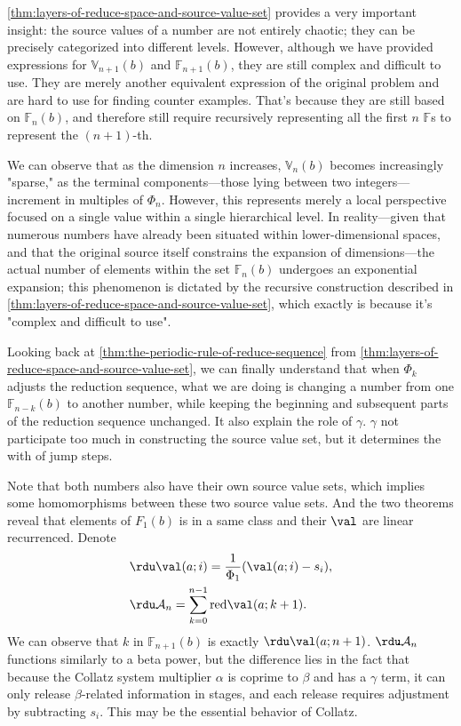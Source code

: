 \cref{thm:layers-of-reduce-space-and-source-value-set} provides a very important insight: the source values of a number are not entirely chaotic; they can be precisely categorized into different levels.
However, although we have provided expressions for $\mathbb{V}_{n+1}(b)$ and $\mathbb{F}_{n+1}(b)$, they are still complex and difficult to use.
They are merely another equivalent expression of the original problem and are hard to use for finding counter examples.
That's because they are still based on $\mathbb{F}_{n}(b)$, and therefore still require recursively representing all the first $n$ $\mathbb{F}$s to represent the $(n+1)$-th.

We can observe that as the dimension $n$ increases, $\mathbb{V}_{n}(b)$ becomes increasingly "sparse," as the terminal components—those lying between two integers—increment in multiples of $\Phi_{n}$. However, this represents merely a local perspective focused on a single value within a single hierarchical level. In reality—given that numerous numbers have already been situated within lower-dimensional spaces, and that the original source itself constrains the expansion of dimensions—the actual number of elements within the set $\mathbb{F}_{n}(b)$ undergoes an exponential expansion; this phenomenon is dictated by the recursive construction described in \cref{thm:layers-of-reduce-space-and-source-value-set}, which exactly is because it's "complex and difficult to use".

Looking back at \cref{thm:the-periodic-rule-of-reduce-sequence} from \cref{thm:layers-of-reduce-space-and-source-value-set}, we can finally understand that when $\Phi_k$ adjusts the reduction sequence, what we are doing is changing a number from one $\mathbb{F}_{n-k}(b)$ to another number, while keeping the beginning and subsequent parts of the reduction sequence unchanged. It also explain the role of $\gamma$. $\gamma$ not participate too much in constructing the source value set, but it determines the with of jump steps.

Note that both numbers also have their own source value sets, which implies some homomorphisms between these two source value sets.
And the two theorems reveal that elements of $F_{1}(b)$ is in a same class and their $\val$ are linear recurrenced. Denote
\begin{align*}
    &\rdu\val(a;i) = \frac{1}{\Phi_1}(\val(a;i) - s_i), \\
    &\rdu\mathcal{A}_n = \sum_{k=0}^{n-1}\mathrm{red}\val(a;k + 1).
\end{align*}
We can observe that $k$ in $\mathbb{F}_{n+1}(b)$ is exactly $\rdu\val(a;n+1)$. $\rdu\mathcal{A}_n$ functions similarly to a beta power, but the difference lies in the fact that because the Collatz system multiplier $\alpha$ is coprime to $\beta$ and has a $\gamma$ term, it can only release $\beta$-related information in stages, and each release requires adjustment by subtracting $s_i$. This may be the essential behavior of Collatz.

